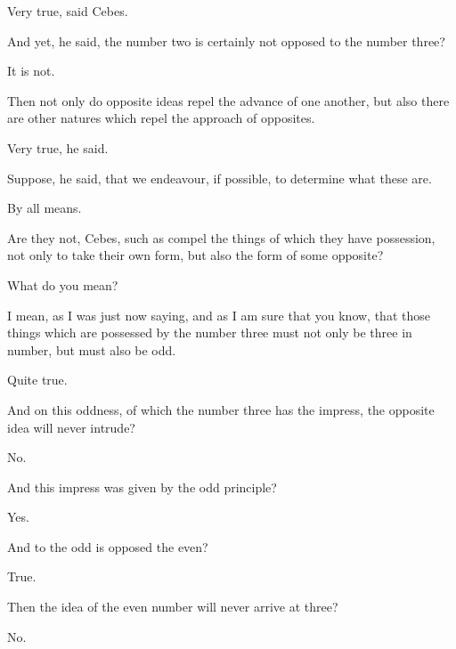\documentclass[11pt,letter]{article}
\begin{document}
\par  Very true, said Cebes.

\par  And yet, he said, the number two is certainly not opposed to the number three?

\par  It is not.

\par  Then not only do opposite ideas repel the advance of one another, but also there are other natures which repel the approach of opposites.

\par  Very true, he said.

\par  Suppose, he said, that we endeavour, if possible, to determine what these are.

\par  By all means.

\par  Are they not, Cebes, such as compel the things of which they have possession, not only to take their own form, but also the form of some opposite?

\par  What do you mean?

\par  I mean, as I was just now saying, and as I am sure that you know, that those things which are possessed by the number three must not only be three in number, but must also be odd.

\par  Quite true.

\par  And on this oddness, of which the number three has the impress, the opposite idea will never intrude?

\par  No.

\par  And this impress was given by the odd principle?

\par  Yes.

\par  And to the odd is opposed the even?

\par  True.

\par  Then the idea of the even number will never arrive at three?

\par  No.
\end{document}
